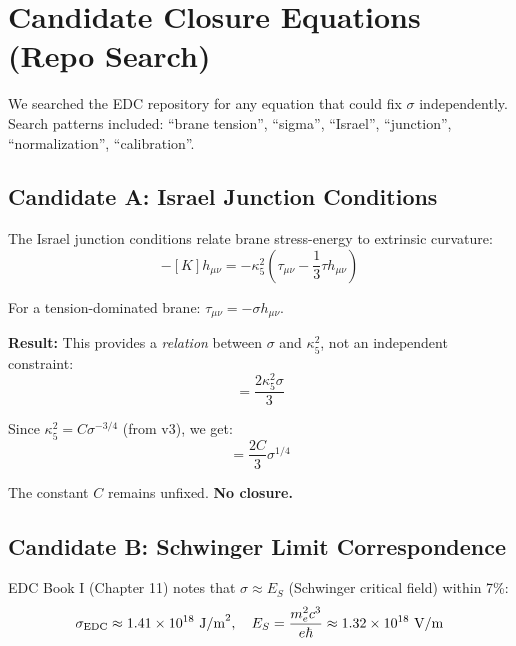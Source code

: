 \documentclass[11pt,a4paper]{article}
\begin{document}
\section{Candidate Closure Equations (Repo Search)}

We searched the EDC repository for any equation that could fix $\sigma$
independently. Search patterns included: ``brane tension'', ``sigma'',
``Israel'', ``junction'', ``normalization'', ``calibration''.

\subsection{Candidate A: Israel Junction Conditions}

The Israel junction conditions relate brane stress-energy to extrinsic curvature:
\begin{equation}
[K_{\mu\nu}] - [K] h_{\mu\nu} = -\kappa_5^2 \left( \tau_{\mu\nu} - \frac{1}{3} \tau h_{\mu\nu} \right)
\end{equation}

For a tension-dominated brane: $\tau_{\mu\nu} = -\sigma h_{\mu\nu}$.

\textbf{Result:} This provides a \textit{relation} between $\sigma$ and
$\kappa_5^2$, not an independent constraint:
\begin{equation}
[K] = \frac{2\kappa_5^2 \sigma}{3}
\end{equation}

Since $\kappa_5^2 = C \sigma^{-3/4}$ (from v3), we get:
\begin{equation}
[K] = \frac{2C}{3} \sigma^{1/4}
\end{equation}

The constant $C$ remains unfixed. \textbf{No closure.}

\subsection{Candidate B: Schwinger Limit Correspondence}

EDC Book I (Chapter 11) notes that $\sigma \approx E_S$ (Schwinger critical
field) within 7\%:
\begin{equation}
\sigma_{\rm EDC} \approx 1.41 \times 10^{18} \text{ J/m}^2, \quad
E_S = \frac{m_e^2 c^3}{e\hbar} \approx 1.32 \times 10^{18} \text{ V/m}
\end{equation}
\end{document}
